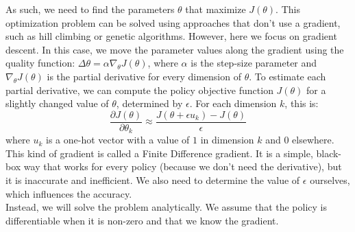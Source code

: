 \documentclass[a4paper, 11pt]{article}
\begin{document}
As such, we need to find the parameters $\theta$ that maximize $J(\theta)$. This optimization problem can be solved using approaches that don't use a gradient, such as hill climbing or genetic algorithms. However, here we focus on gradient descent. In this case, we move the parameter values along the gradient using the quality function: $\Delta \theta = \alpha \nabla_{\theta} J(\theta)$, where $\alpha$ is the step-size parameter and $\nabla_{\theta} J(\theta)$ is the partial derivative for every dimension of $\theta$. To estimate each partial derivative, we can compute the policy objective function $J(\theta)$ for a slightly changed value of $\theta$, determined by $\epsilon$. For each dimension $k$, this is:
\begin{equation}
\frac{\partial J(\theta)}{\partial \theta_k} \approx \frac{J(\theta + \epsilon u_k) - J(\theta)}{\epsilon}
\end{equation}
where $u_k$ is a one-hot vector with a value of $1$ in dimension $k$ and $0$ elsewhere. This kind of gradient is called a Finite Difference gradient. It is a simple, black-box way that works for every policy (because we don't need the derivative), but it is inaccurate and inefficient. We also need to determine the value of $\epsilon$ ourselves, which influences the accuracy.\\

Instead, we will solve the problem analytically. We assume that the policy is differentiable when it is non-zero and that we know the gradient.


\end{document}
